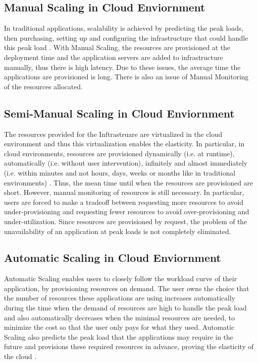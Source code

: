 \documentclass[9pt,twocolumn,twoside]{styles/osajnl}
\begin{document}
\subsection{Manual Scaling in Cloud Enviornment}

In traditional applications, scalability is achieved by predicting the
peak loads, then purchasing, setting up and configuring the
infrastructure that could handle this peak load \cite{ManualScaling}. With Manual
Scaling, the resources are provisioned at the deployment time and the
application servers are added to infrastructure manually, thus there is
high latency. Due to these issues, the average time the applications
are provisioned is long. There is also an issue of Manual
Monitoring of the resources allocated.

\subsection{Semi-Manual Scaling in Cloud Enviornment}

The resources provided for the Inftrastruare are virtualized in the cloud
environment and thus this virtualization enables the elasticity. In
particular, in cloud environments, resources are provisioned
dynamically (i.e. at runtime), automatically (i.e. without user
intervention), infinitely and almost immediately (i.e. within minutes
and not hours, days, weeks or months like in traditional
environments) \cite{elastic-beanstalk}. Thus, the mean time until when
the resources are provisioned are short.  However, manual monitoring
of resources is still necessary. In particular, users are forced to
make a tradeoff between requesting more resources to avoid
under-provisioning and requesting fewer resources to avoid
over-provisioning and under-utilization. Since resources are
provisioned by request, the problem of the unavailability of an
application at peak loads is not completely eliminated.

\subsection{Automatic Scaling in Cloud Enviornment}

Automatic Scaling enables users to closely follow the workload curve
of their application, by provisioning resources on demand. The user
owns the choice that the number of resources these applications are
using increases automatically during the time when the demand of
resources are high to handle the peak load and also automatically
decreases when the minimal resources are needed, to minimize the cost
so that the user only pays for what they used. Automatic Scaling also
predicts the peak load that the applications may require in the future
and provisions these required resources in advance, proving the
elasticity of the cloud  \cite{elastic-beanstalk}.
\end{document}
